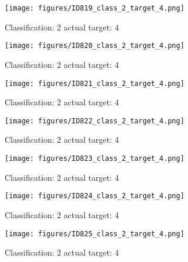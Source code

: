 \begin{figure}[h!]
\begin{center}
\texttt{[image: figures/ID819\_class\_2\_target\_4.png]}
\end{center}
\caption{ Classification: 2 actual target: 4}
\label{fig:ID819_class_2_target_4}
\end{figure}
\begin{figure}[h!]
\begin{center}
\texttt{[image: figures/ID820\_class\_2\_target\_4.png]}
\end{center}
\caption{ Classification: 2 actual target: 4}
\label{fig:ID820_class_2_target_4}
\end{figure}
\begin{figure}[h!]
\begin{center}
\texttt{[image: figures/ID821\_class\_2\_target\_4.png]}
\end{center}
\caption{ Classification: 2 actual target: 4}
\label{fig:ID821_class_2_target_4}
\end{figure}
\begin{figure}[h!]
\begin{center}
\texttt{[image: figures/ID822\_class\_2\_target\_4.png]}
\end{center}
\caption{ Classification: 2 actual target: 4}
\label{fig:ID822_class_2_target_4}
\end{figure}
\begin{figure}[h!]
\begin{center}
\texttt{[image: figures/ID823\_class\_2\_target\_4.png]}
\end{center}
\caption{ Classification: 2 actual target: 4}
\label{fig:ID823_class_2_target_4}
\end{figure}
\begin{figure}[h!]
\begin{center}
\texttt{[image: figures/ID824\_class\_2\_target\_4.png]}
\end{center}
\caption{ Classification: 2 actual target: 4}
\label{fig:ID824_class_2_target_4}
\end{figure}
\begin{figure}[h!]
\begin{center}
\texttt{[image: figures/ID825\_class\_2\_target\_4.png]}
\end{center}
\caption{ Classification: 2 actual target: 4}
\label{fig:ID825_class_2_target_4}
\end{figure}
